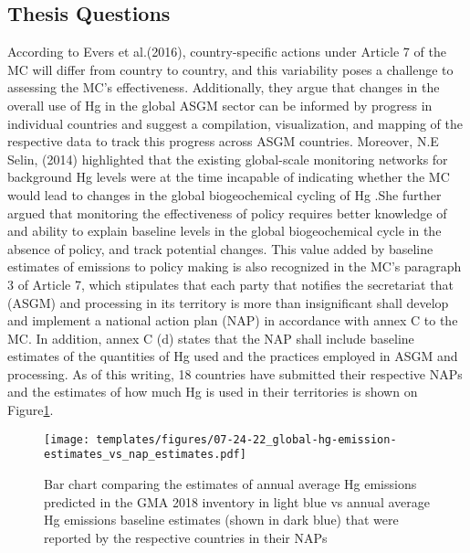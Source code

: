 \begin{flushleft}


\section{Thesis Questions}
According to Evers et al.(2016), country-specific actions under Article 7 of the MC will differ from country to country, and this variability poses a challenge to assessing the MC's effectiveness. Additionally, they argue that changes in the overall use of Hg in the global ASGM sector can be informed by progress in individual countries and suggest a compilation, visualization, and mapping of the respective data to track this progress across ASGM countries. Moreover, N.E Selin, (2014) highlighted that the existing global-scale monitoring networks for background Hg levels were at the time incapable of indicating whether the MC would lead to changes in the global biogeochemical cycling of Hg .She further argued that monitoring the effectiveness of policy requires better knowledge of and ability to explain baseline levels in the global biogeochemical cycle in the absence of policy, and track potential changes. This value added by baseline estimates of emissions to policy making is also recognized in the MC's paragraph 3 of Article 7, which stipulates that each party that notifies the secretariat that (ASGM) and processing in its territory is more than insignificant shall develop and implement a national action plan (NAP) in accordance with annex C to the MC. In addition, annex C (d) states that the NAP shall include baseline estimates of the quantities of Hg used and the practices employed in ASGM and processing. As of this writing, 18 countries have submitted their respective NAPs and the estimates of how much Hg is used in their territories is shown on Figure\ref{fig:global-hg-emission-estimates_vs_nap_estimates}. 

\begin{figure}[H]
  \texttt{[image: templates/figures/07-24-22\_global-hg-emission-estimates\_vs\_nap\_estimates.pdf]}
  \centering
  \caption{Bar chart comparing the estimates of annual average Hg emissions predicted in the GMA 2018 inventory in light blue vs annual average Hg emissions baseline estimates (shown in dark blue) that were reported by the respective countries in their NAPs }
  \label{fig:global-hg-emission-estimates_vs_nap_estimates}
\end{figure}
\FloatBarrier


\end{flushleft}
